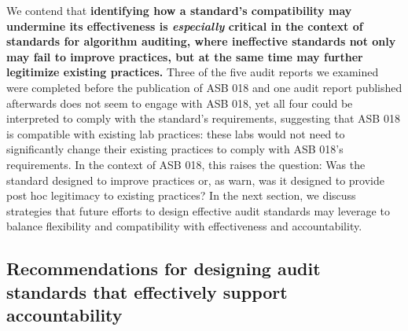 We contend that \textbf{identifying how a standard’s compatibility may undermine its effectiveness is \textit{especially} critical in the context of standards for algorithm auditing, where ineffective standards not only may fail to improve practices, but at the same time may further legitimize  existing practices.} Three of the five audit reports we examined were completed before the publication of ASB 018 and one audit report published afterwards does not seem to engage with ASB 018, yet all four could be interpreted to comply with the standard’s requirements, suggesting that ASB 018 is compatible with existing lab practices: these labs would not need to significantly change their existing practices to comply with ASB 018’s requirements. In the context of ASB 018, this raises the question: Was the standard designed to improve practices or, as \cite{morrison2020vacuous} warn, was it designed to provide post hoc legitimacy to existing practices? In the next section, we discuss strategies that future efforts to design effective audit standards may leverage to balance flexibility and compatibility with effectiveness and accountability.


\subsection{Recommendations for designing audit standards that effectively support accountability}
\label{sec:disc-design}
